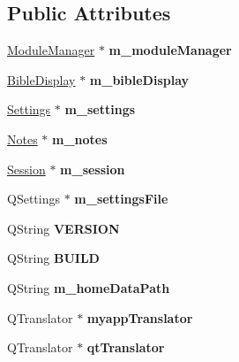 \subsection*{Public Attributes}
\begin{DoxyCompactItemize}
\item 
\hypertarget{classMainWindow_ad0cd93fa38bb5ec71d8973ac66af2615}{
\hyperlink{classModuleManager}{ModuleManager} $\ast$ {\bfseries m\_\-moduleManager}}
\label{classMainWindow_ad0cd93fa38bb5ec71d8973ac66af2615}

\item 
\hypertarget{classMainWindow_a192b3d658f9ef44b532a66ac4b375176}{
\hyperlink{classBibleDisplay}{BibleDisplay} $\ast$ {\bfseries m\_\-bibleDisplay}}
\label{classMainWindow_a192b3d658f9ef44b532a66ac4b375176}

\item 
\hypertarget{classMainWindow_ae5f31d6baa938f1fdf33694bb36501bc}{
\hyperlink{classSettings}{Settings} $\ast$ {\bfseries m\_\-settings}}
\label{classMainWindow_ae5f31d6baa938f1fdf33694bb36501bc}

\item 
\hypertarget{classMainWindow_a0a0315b93be2c938662a02e1d813cf49}{
\hyperlink{classNotes}{Notes} $\ast$ {\bfseries m\_\-notes}}
\label{classMainWindow_a0a0315b93be2c938662a02e1d813cf49}

\item 
\hypertarget{classMainWindow_aca0fe0d96000882083d46631d79e950d}{
\hyperlink{classSession}{Session} $\ast$ {\bfseries m\_\-session}}
\label{classMainWindow_aca0fe0d96000882083d46631d79e950d}

\item 
\hypertarget{classMainWindow_a77fe7254ab86dd608773a14e47c46107}{
QSettings $\ast$ {\bfseries m\_\-settingsFile}}
\label{classMainWindow_a77fe7254ab86dd608773a14e47c46107}

\item 
\hypertarget{classMainWindow_a3a92e4812a8695f1eb366a4fcad5015a}{
QString {\bfseries VERSION}}
\label{classMainWindow_a3a92e4812a8695f1eb366a4fcad5015a}

\item 
\hypertarget{classMainWindow_a52a9752c79e2f4e23aaf8e83fdcc73f9}{
QString {\bfseries BUILD}}
\label{classMainWindow_a52a9752c79e2f4e23aaf8e83fdcc73f9}

\item 
\hypertarget{classMainWindow_abb8d42b6e667d979f29b5198fe7a1d9f}{
QString {\bfseries m\_\-homeDataPath}}
\label{classMainWindow_abb8d42b6e667d979f29b5198fe7a1d9f}

\item 
\hypertarget{classMainWindow_a9715e4f3c6516a29086cbeab4d24e4b9}{
QTranslator $\ast$ {\bfseries myappTranslator}}
\label{classMainWindow_a9715e4f3c6516a29086cbeab4d24e4b9}

\item 
\hypertarget{classMainWindow_a24d77db9a9c7cd5239866e356ccfe280}{
QTranslator $\ast$ {\bfseries qtTranslator}}
\label{classMainWindow_a24d77db9a9c7cd5239866e356ccfe280}

\end{DoxyCompactItemize}
